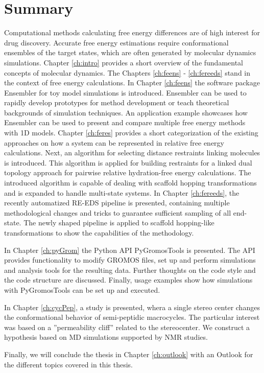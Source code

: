 \chapter{Summary}
Computational methods calculating free energy differences are of high interest for drug discovery. Accurate free energy estimations require conformational ensembles of the target states, which are often generated by molecular dynamics simulations. Chapter \ref{ch:intro} provides a short overview of the fundamental concepts of molecular dynamics.   
The Chapters \ref{ch:feens} - \ref{ch:fereeds} stand in the context of free energy calculations. 
In Chapter \ref{ch:feens} the software package Ensembler for toy model simulations is introduced. Ensembler can be used to rapidly develop prototypes for method development or teach theoretical backgrounds of simulation techniques.  An application example showcases how Ensembler can be used to present and compare multiple free energy methods with 1D models. 
Chapter \ref{ch:feres} provides a short categorization of the existing approaches on how a system can be represented in relative free energy calculations. Next, an algorithm for selecting distance restraints linking molecules is introduced. This algorithm is applied for building restraints for a linked dual topology approach for pairwise relative hydration-free energy calculations. The introduced algorithm is capable of dealing with scaffold hopping transformations and is expanded to handle multi-state systems.
In Chapter \ref{ch:fereeds}, the recently automatized RE-EDS pipeline is presented, containing multiple methodological changes and tricks to guarantee sufficient sampling of all end-state. The newly shaped pipeline is applied to scaffold hopping-like transformations to show the capabilities of the methodology.

In Chapter \ref{ch:pyGrom} the Python API PyGromosTools is presented. The API provides functionality to modify GROMOS files, set up and perform simulations and analysis tools for the resulting data. Further thoughts on the code style and the code structure are discussed. Finally, usage examples show how simulations with PyGromosTools can be set up and executed. 

In Chapter \ref{ch:cycPep}, a study is presented, whera a single stereo center changes  the conformational behavior of semi-peptidic macrocycles. The particular interest was based on a ''permeability cliff'' related to the stereocenter. We construct a hypothesis based on MD simulations supported by NMR studies.

Finally, we will conclude the thesis in Chapter \ref{ch:outlook} with an Outlook for the different topics covered in this thesis.
